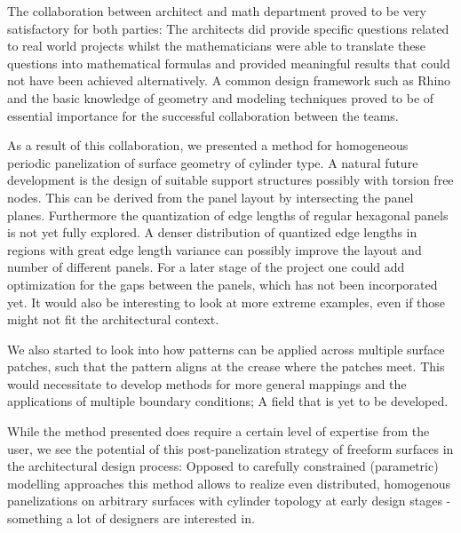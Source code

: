 \documentclass[Thesis.tex]{subfiles}
\begin{document}
The collaboration between architect and math department proved to be
very satisfactory for both parties: The architects did provide
specific questions related to real world projects whilst the
mathematicians were able to translate these questions into
mathematical formulas and provided meaningful results that could not
have been achieved alternatively. A common design framework such as Rhino
and the basic knowledge of \nurbs geometry and modeling techniques
proved to be of essential importance for the successful collaboration
between the teams.

As a result of this collaboration, we presented a method for
homogeneous periodic panelization of \nurbs surface geometry of
cylinder type.  A natural future development is the design of suitable
support structures possibly with torsion free nodes. This can be
derived from the panel layout by intersecting the panel
planes. Furthermore the quantization of edge lengths of regular
hexagonal panels is not yet fully explored. A denser distribution of
quantized edge lengths in regions with great edge length variance can
possibly improve the layout and number of different panels. 
%
For a later stage of the project one could add optimization for the
gaps between the panels, which has not been incorporated yet. It would
also be interesting to look at more extreme examples, even if those
might not fit the architectural context.

We also started to look into how patterns can be applied across
multiple surface patches, such that the pattern aligns at the crease
where the patches meet. This would necessitate to develop methods for
more general mappings and the applications of multiple boundary
conditions; A field that is yet to be developed.

While the method presented does require a certain level of expertise
from the user, we see the potential of this post-panelization strategy
of freeform surfaces in the architectural design process: Opposed to
carefully constrained (parametric) modelling approaches this method
allows to realize even distributed, homogenous panelizations on
arbitrary surfaces with cylinder topology at early design stages -
something a lot of designers are interested in.

%
%
%
%
%
%
%
%

\subfilebibliographytwo
\end{document}
